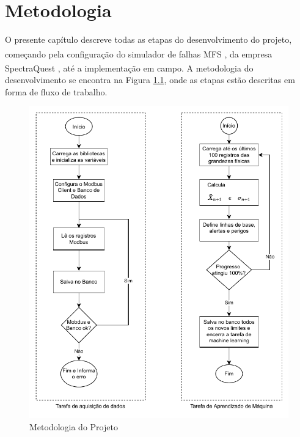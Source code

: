 
\chapter{Metodologia}

O presente capítulo descreve todas as etapas do desenvolvimento do projeto, começando pela configuração do simulador de falhas MFS 
\textsuperscript \textregistered, da empresa SpectraQuest \textsuperscript \textregistered, até a implementação em campo. A metodologia do
desenvolvimento se encontra na Figura \ref{fig:metodologia}, onde as etapas estão descritas em forma de fluxo de trabalho.

\begin{figure}[H]
    \caption{Metodologia do Projeto}
    \begin{center}
        \includegraphics[scale=1.1, page=3]{metodologia/img/software.pdf}
    \end{center}
    \label{fig:metodologia}
\end{figure}

